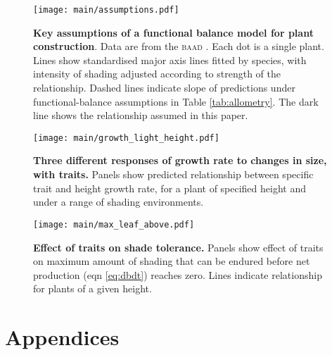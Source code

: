 \documentclass[a4paper,11pt]{article}
\begin{document}
\newpage

\begin{figure}[ht]
\centering
\texttt{[image: main/assumptions.pdf]}
\caption{\textbf{Key assumptions of a functional balance model for plant construction}. Data are from the \textsc{baad} \citep{Falster-2015b}. Each dot is a single plant. Lines show standardised major axis lines fitted by species, with intensity of shading adjusted according to strength of the relationship. Dashed lines indicate slope of predictions under functional-balance assumptions in Table \ref{tab:allometry}. 
The dark line shows the relationship assumed in this paper.
\label{fig:assumptions}}
\end{figure}

\newpage

\begin{figure}[ht]
\centering
\texttt{[image: main/growth\_light\_height.pdf]}
\caption{\textbf{Three different responses of growth rate to changes in size, with traits.} Panels show predicted relationship between specific trait and height growth rate, for a plant of specified height and under a range of shading environments.
\label{fig:growth_light_height}}
\end{figure}



\newpage

\begin{figure}[ht]
\centering
\texttt{[image: main/max\_leaf\_above.pdf]}
\caption{\textbf{Effect of traits on shade tolerance.} Panels show effect of traits on maximum amount of shading that can be endured before net production (eqn \ref{eq:dbdt}) reaches zero. Lines indicate relationship for plants of a given height. \label{fig:wplcp}}
\end{figure}

\clearpage

\section{Appendices}
\end{document}
